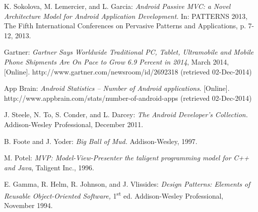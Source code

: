 \begin{thebibliography}{1}

K. Sokolova, M. Lemercier, and L. Garcia: \emph{Android Passive MVC: a Novel Architecture Model for Android Application Development.} In: PATTERNS 2013, The Fifth International Conferences on Pervasive Patterns and Applications, p. 7-12, 2013.

Gartner: \emph{Gartner Says Worldwide Traditional PC, Tablet, Ultramobile and 
Mobile Phone Shipments Are On Pace to Grow 6.9 Percent in 2014}, March 2014, 
[Online]. http://www.gartner.com/newsroom/id/2692318 (retrieved 02-Dec-2014)

App Brain: \emph{Android Statistics -- Number of Android applications}. 
[Online].
http://www.appbrain.com/stats/number-of-android-apps (retrieved 02-Dec-2014)

J. Steele, N. To, S. Conder, and L. Darcey: \emph{The Android Developer's Collection.} Addison-Wesley Professional, December 2011.

B. Foote and J. Yoder: \emph{Big Ball of Mud.} Addison-Wesley, 1997.

M. Potel: \emph{MVP: Model-View-Presenter the taligent programming model for C++ and Java}, Taligent Inc., 1996.

E. Gamma, R. Helm, R. Johnson, and J. Vlissides: \emph{Design Patterns: Elements of Reusable Object-Oriented Software,} 1\textsuperscript{st} ed. Addison-Wesley Professional, November 1994.




\end{thebibliography}